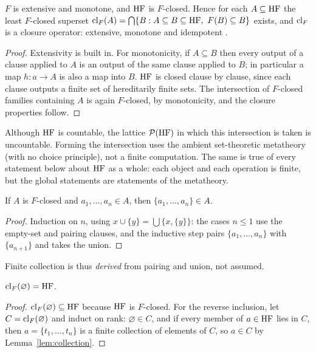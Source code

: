 \begin{lemma}\label{lem:closure}
$F$ is extensive and monotone, and $\mathrm{HF}$ is $F$-closed. Hence for each $A\subseteq\mathrm{HF}$ the least
$F$-closed superset $\operatorname{cl}_F(A)=\bigcap\{B: A\subseteq B\subseteq\mathrm{HF},\ F(B)\subseteq B\}$ exists,
and $\operatorname{cl}_F$ is a closure operator: extensive, monotone and idempotent
\citep{DaveyPriestley2002,Tarski1955}.
\end{lemma}

\begin{proof}
Extensivity is built in. For monotonicity, if $A\subseteq B$ then every output of a clause applied
to $A$ is an output of the same clause applied to $B$; in particular a map $h\colon a\to A$ is
also a map into $B$. $\mathrm{HF}$ is closed clause by clause, since each clause outputs a finite set of
hereditarily finite sets. The intersection of $F$-closed families containing $A$ is again
$F$-closed, by monotonicity, and the closure properties follow.
\end{proof}

\noindent Although $\mathrm{HF}$ is countable, the lattice $\mathcal{P}(\mathrm{HF})$ in which this intersection is
taken is uncountable. Forming the intersection uses the ambient set-theoretic metatheory (with no
choice principle), not a finite computation. The same is true of every statement below about
$\mathrm{HF}$ as a whole: each object and each operation is finite, but the global statements are
statements of the metatheory.

\begin{lemma}\label{lem:collection}
If $A$ is $F$-closed and $a_1,\dots,a_n\in A$, then $\{a_1,\dots,a_n\}\in A$.
\end{lemma}

\begin{proof}
Induction on $n$, using $x\cup\{y\}=\bigcup\{x,\{y\}\}$: the cases $n\le 1$ use the empty-set
and pairing clauses, and the inductive step pairs $\{a_1,\dots,a_n\}$ with $\{a_{n+1}\}$ and takes
the union.
\end{proof}

\noindent Finite collection is thus \emph{derived} from pairing and union, not assumed.

\begin{theorem}\label{thm:hfclosure}
$\operatorname{cl}_F(\varnothing)=\mathrm{HF}$.
\end{theorem}

\begin{proof}
$\operatorname{cl}_F(\varnothing)\subseteq\mathrm{HF}$ because $\mathrm{HF}$ is $F$-closed. For the reverse inclusion, let
$C=\operatorname{cl}_F(\varnothing)$ and induct on rank: $\varnothing\in C$, and if every member of $a\in\mathrm{HF}$ lies
in $C$, then $a=\{t_1,\dots,t_n\}$ is a finite collection of elements of $C$, so $a\in C$ by
Lemma~\ref{lem:collection}.
\end{proof}

